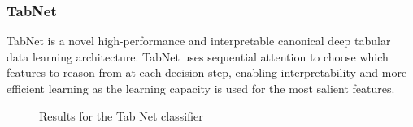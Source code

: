 \subsubsection{TabNet}
TabNet \cite{arik2020tabnet} is a novel high-performance and interpretable canonical deep tabular data learning architecture. TabNet uses sequential attention to choose which features to reason from at each decision step, enabling interpretability and more efficient learning as the learning capacity is used for the most salient features.
\begin{figure}[H]
    \centering
    \caption{Results for the Tab Net classifier}
    \label{fig:TNResults}
\end{figure}

